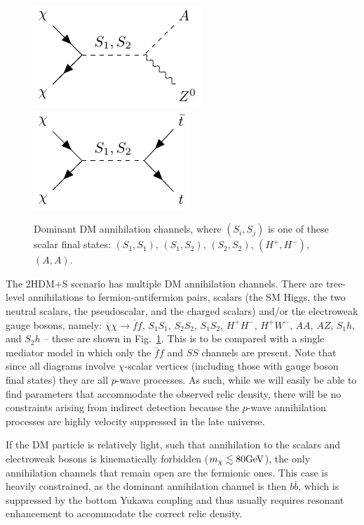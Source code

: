 \begin{figure}
    \includegraphics{texinputs/05_relic/figures/relic_scalar/XXZA.pdf} \hspace{2em} 
    \includegraphics{texinputs/05_relic/figures/relic_scalar/XXtt.pdf} 
    \caption{Dominant DM annihilation channels, where $(S_i,S_j)$ is one of these scalar final states: $(S_1,S_1)$, $ (S_1,S_2)$, $(S_2,S_2)$, $(H^+,H^-)$, $(A,A)$.}
    \label{fig:feyn}
\end{figure}

The 2HDM+S scenario has multiple DM annihilation channels.
There are tree-level annihilations to fermion-antifermion pairs,
scalars (the SM Higgs, the two neutral scalars, the pseudoscalar, and the
charged scalars) and/or the electroweak gauge bosons,
namely: $\overline{\chi}\chi \rightarrow \overline{f}f$, $S_1 S_1$, $S_2
S_2$, $S_1 S_2$, $H^+ H^-$, $H^+ W^-$, $A A$, $A Z$, $S_1 h$, and $S_2
h$ -- these are shown in Fig.~\ref{fig:feyn}. This is to be compared with a single mediator model in which only
the $\overline{f}f$ and $SS$ channels are present. Note that since all
diagrams involve $\chi$-scalar vertices (including those with gauge
boson final states) they are all $p$-wave processes. As such, while we
will easily be able to find parameters that accommodate the observed
relic density, there will be no constraints arising from indirect
detection because the $p$-wave annihilation processes are highly velocity
suppressed in the late universe.


If the DM particle is relatively light, such that annihilation to the
scalars and electroweak bosons is kinematically forbidden ($m_\chi \lesssim
80\textrm{GeV}$), the only annihilation channels that remain open are the
fermionic ones.  This case is heavily constrained, as the dominant
annihilation channel is then $b\bar{b}$, which is suppressed by the
bottom Yukawa coupling and thus usually requires resonant enhancement
to accommodate the correct relic density.


